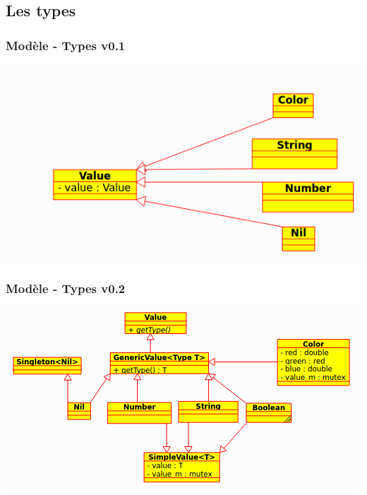
\subsection{Les types}
\begin{frame}
\frametitle{Modèle - Types v0.1}
\centering
\includegraphics[scale=0.5]{doc/Presentation/image/type01.png}
\end{frame}

\begin{frame}
\frametitle{Modèle - Types v0.2}
\centering
\includegraphics[scale=0.55]{doc/Presentation/image/types02.png}
\end{frame}

